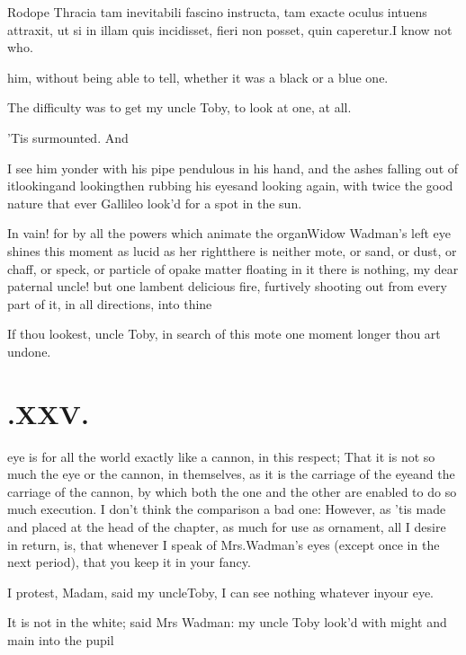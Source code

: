 \documentclass{article}
\begin{document}
\bgroup\small
\indent\fnast\enspace 
Rodope Thracia tam inevitabili fascino\break
instructa, tam exacte oculus intuens attraxit,\break
ut si in illam quis incidisset, fieri non posset,\break
quin caperetur.\tsh I know not who.\par\egroup
{}\eject 
\noindent
him, without being able to tell,
whether it was a black or a blue one.

The difficulty was to get my uncle Toby, to look at one,
at all.

’Tis surmounted. And

I see him yonder with his pipe pendulous in his hand, and the
ashes falling out of it\tsk looking\tsk and
looking\tsk\break then
rubbing his eyes\tsh and looking again, with twice the
good nature that ever Gallileo look’d for a spot in the
sun.

\tsh In vain! for by all the powers\break
which animate the organ\tsk Widow\break
Wadman’s left eye shines this
moment as lucid as her right\tsk there is neither mote, or
sand, or dust, or chaff, or speck, or particle of opake matter
floating in it \tsk there is nothing, my dear paternal uncle! but
one lambent delicious fire, furtively shooting out from every part
of it, in all directions, into thine\tsh

\tsh If thou lookest, uncle Toby, in\break
search of this mote one moment longer\break
\tsh thou art undone.


\section{.\enspace XXV.}

eye is for all the
world exactly like a cannon, in this
respect;\break
That it is not so much the eye or the cannon, in themselves, as it is the carriage
of the eye\tsh and the carriage of the cannon, by which both the one and the other
are enabled to do so much execution. I don’t think the comparison a bad one:
However, as ’tis made and placed at the head of the chapter, as much for use as
ornament, all I desire in return, is, that whenever I speak of Mrs.\@ Wadman’s eyes
(except once in the next period), that you keep it in your fancy.

I protest, Madam, said my uncle\break Toby, I can see nothing
whatever in\break your eye.

It is not in the white; said Mrs Wadman: my uncle
Toby look’d with might and main into the
pupil\tsh
\end{document}
